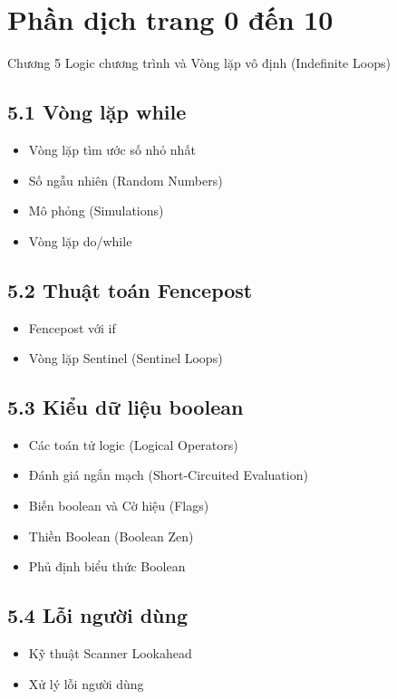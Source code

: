 \section{Phần dịch trang 0 đến 10}
Chương 5 Logic chương trình và Vòng lặp vô định (Indefinite Loops)

\subsection*{5.1 Vòng lặp while}
\begin{itemize}
    \item Vòng lặp tìm ước số nhỏ nhất
    \item Số ngẫu nhiên (Random Numbers)
    \item Mô phỏng (Simulations)
    \item Vòng lặp do/while
\end{itemize}

\subsection*{5.2 Thuật toán Fencepost}
\begin{itemize}
    \item Fencepost với if
    \item Vòng lặp Sentinel (Sentinel Loops)
\end{itemize}

\subsection*{5.3 Kiểu dữ liệu boolean}
\begin{itemize}
    \item Các toán tử logic (Logical Operators)
    \item Đánh giá ngắn mạch (Short-Circuited Evaluation)
    \item Biến boolean và Cờ hiệu (Flags)
    \item Thiền Boolean (Boolean Zen)
    \item Phủ định biểu thức Boolean
\end{itemize}

\subsection*{5.4 Lỗi người dùng}
\begin{itemize}
    \item Kỹ thuật Scanner Lookahead
    \item Xử lý lỗi người dùng
\end{itemize}

